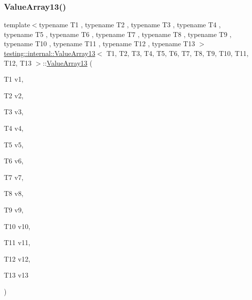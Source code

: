 \subsubsection{\texorpdfstring{ValueArray13()}{ValueArray13()}\hspace{0.1cm}{\footnotesize\ttfamily [1/2]}}
{\footnotesize\ttfamily template$<$typename T1 , typename T2 , typename T3 , typename T4 , typename T5 , typename T6 , typename T7 , typename T8 , typename T9 , typename T10 , typename T11 , typename T12 , typename T13 $>$ \\
\mbox{\hyperlink{classtesting_1_1internal_1_1ValueArray13}{testing\+::internal\+::\+Value\+Array13}}$<$ T1, T2, T3, T4, T5, T6, T7, T8, T9, T10, T11, T12, T13 $>$\+::\mbox{\hyperlink{classtesting_1_1internal_1_1ValueArray13}{Value\+Array13}} (\begin{DoxyParamCaption}\item[{T1}]{v1,  }\item[{T2}]{v2,  }\item[{T3}]{v3,  }\item[{T4}]{v4,  }\item[{T5}]{v5,  }\item[{T6}]{v6,  }\item[{T7}]{v7,  }\item[{T8}]{v8,  }\item[{T9}]{v9,  }\item[{T10}]{v10,  }\item[{T11}]{v11,  }\item[{T12}]{v12,  }\item[{T13}]{v13 }\end{DoxyParamCaption})\hspace{0.3cm}{\ttfamily [inline]}}

\mbox{\label{classtesting_1_1internal_1_1ValueArray13_a150575c5629d3a589bf2baba0371b1da}} 
